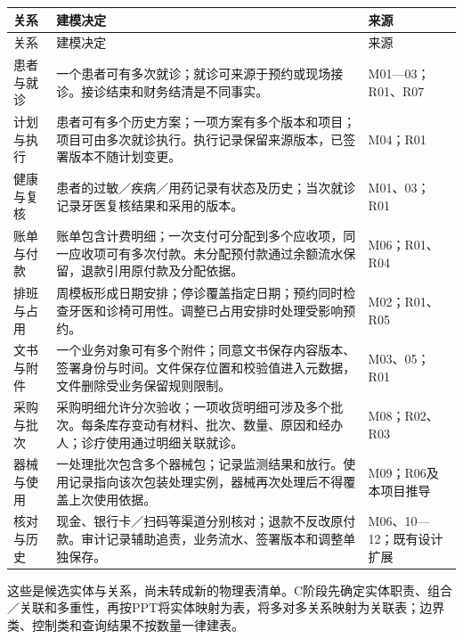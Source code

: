 \documentclass[UTF8,a4paper,zihao=-4,fontset=none]{ctexart}
\begin{document}
{\small
\begin{longtable}{@{}p{2.3cm}p{10.0cm}p{3.2cm}@{}}
\toprule
关系 & 建模决定 & 来源 \\ \midrule
\endfirsthead
\toprule
关系 & 建模决定 & 来源 \\ \midrule
\endhead
\raggedright\arraybackslash 患者与就诊 & \raggedright\arraybackslash 一个患者可有多次就诊；就诊可来源于预约或现场接诊。接诊结束和财务结清是不同事实。 & \raggedright\arraybackslash M01—03；R01、R07 \\[4pt]
\raggedright\arraybackslash 计划与执行 & \raggedright\arraybackslash 患者可有多个历史方案；一项方案有多个版本和项目；项目可由多次就诊执行。执行记录保留来源版本，已签署版本不随计划变更。 & \raggedright\arraybackslash M04；R01 \\[4pt]
\raggedright\arraybackslash 健康与复核 & \raggedright\arraybackslash 患者的过敏／疾病／用药记录有状态及历史；当次就诊记录牙医复核结果和采用的版本。 & \raggedright\arraybackslash M01、03；R01 \\[4pt]
\raggedright\arraybackslash 账单与付款 & \raggedright\arraybackslash 账单包含计费明细；一次支付可分配到多个应收项，同一应收项可有多次付款。未分配预付款通过余额流水保留，退款引用原付款及分配依据。 & \raggedright\arraybackslash M06；R01、R04 \\[4pt]
\raggedright\arraybackslash 排班与占用 & \raggedright\arraybackslash 周模板形成日期安排；停诊覆盖指定日期；预约同时检查牙医和诊椅可用性。调整已占用安排时处理受影响预约。 & \raggedright\arraybackslash M02；R01、R05 \\[4pt]
\raggedright\arraybackslash 文书与附件 & \raggedright\arraybackslash 一个业务对象可有多个附件；同意文书保存内容版本、签署身份与时间。文件保存位置和校验值进入元数据，文件删除受业务保留规则限制。 & \raggedright\arraybackslash M03、05；R01 \\[4pt]
\raggedright\arraybackslash 采购与批次 & \raggedright\arraybackslash 采购明细允许分次验收；一项收货明细可涉及多个批次。每条库存变动有材料、批次、数量、原因和经办人；诊疗使用通过明细关联就诊。 & \raggedright\arraybackslash M08；R02、R03 \\[4pt]
\raggedright\arraybackslash 器械与使用 & \raggedright\arraybackslash 一处理批次包含多个器械包；记录监测结果和放行。使用记录指向该次包装处理实例，器械再次处理后不得覆盖上次使用依据。 & \raggedright\arraybackslash M09；R06及本项目推导 \\[4pt]
\raggedright\arraybackslash 核对与历史 & \raggedright\arraybackslash 现金、银行卡／扫码等渠道分别核对；退款不反改原付款。审计记录辅助追责，业务流水、签署版本和调整单独保存。 & \raggedright\arraybackslash M06、10—12；既有设计扩展 \\[4pt]
\bottomrule
\end{longtable}
}
这些是候选实体与关系，尚未转成新的物理表清单。C阶段先确定实体职责、组合／关联和多重性，再按PPT将实体映射为表，将多对多关系映射为关联表；边界类、控制类和查询结果不按数量一律建表。
\end{document}

